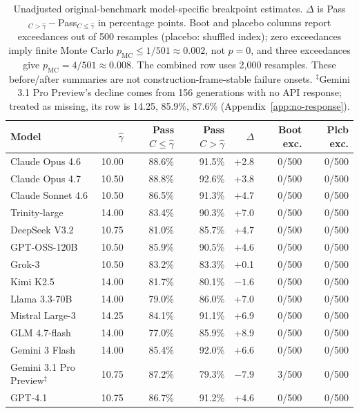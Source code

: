 \documentclass{article}
\begin{document}
\begin{table}[h]
\centering
\caption{Unadjusted original-benchmark model-specific breakpoint estimates. $\Delta$ is Pass$_{C>\hat{\gamma}}-$Pass$_{C\leq\hat{\gamma}}$ in percentage points. Boot and placebo columns report exceedances out of 500 resamples (placebo: shuffled index); zero exceedances imply finite Monte Carlo $p_{\mathrm{MC}}\leq1/501\approx0.002$, not $p=0$, and three exceedances give $p_{\mathrm{MC}}=4/501\approx0.008$. The combined row uses 2{,}000 resamples. These before/after summaries are not construction-frame-stable failure onsets. $^\ddagger$Gemini 3.1 Pro Preview's decline comes from 156 generations with no API response; treated as missing, its row is 14.25, 85.9\%, 87.6\% (Appendix~\ref{app:no-response}).}
\label{tab:per-model}
\small
\begin{tabular}{@{}lrrrrrr@{}}
\toprule
Model & $\hat{\gamma}$ & Pass $C\leq\hat{\gamma}$ & Pass $C>\hat{\gamma}$ & $\Delta$ & Boot exc. & Plcb exc. \\
\midrule
Claude Opus 4.6          & 10.00 & 88.6\% & 91.5\% & +2.8 & 0/500 & 0/500 \\
Claude Opus 4.7          & 10.50 & 88.8\% & 92.6\% & +3.8 & 0/500 & 0/500 \\
Claude Sonnet 4.6        & 10.50 & 86.5\% & 91.3\% & +4.7 & 0/500 & 0/500 \\
Trinity-large            & 14.00 & 83.4\% & 90.3\% & +7.0 & 0/500 & 0/500 \\
DeepSeek V3.2            & 10.75 & 81.0\% & 85.7\% & +4.7 & 0/500 & 0/500 \\
GPT-OSS-120B             & 10.50 & 85.9\% & 90.5\% & +4.6 & 0/500 & 0/500 \\
Grok-3                   & 10.50 & 83.2\% & 83.3\% & +0.1 & 0/500 & 0/500 \\
Kimi K2.5                & 14.00 & 81.7\% & 80.1\% & $-1.6$ & 0/500 & 0/500 \\
Llama 3.3-70B            & 14.00 & 79.0\% & 86.0\% & +7.0 & 0/500 & 0/500 \\
Mistral Large-3          & 14.25 & 84.1\% & 91.1\% & +6.9 & 0/500 & 0/500 \\
GLM 4.7-flash            & 14.00 & 77.0\% & 85.9\% & +8.9 & 0/500 & 0/500 \\
Gemini 3 Flash           & 14.00 & 85.4\% & 92.0\% & +6.6 & 0/500 & 0/500 \\
Gemini 3.1 Pro Preview$^\ddagger$ & 10.75 & 87.2\% & 79.3\% & $-7.9$ & 3/500 & 0/500 \\
GPT-4.1                  & 10.75 & 86.7\% & 91.2\% & +4.6 & 0/500 & 0/500 \\

\end{tabular}
\end{table}
\end{document}
